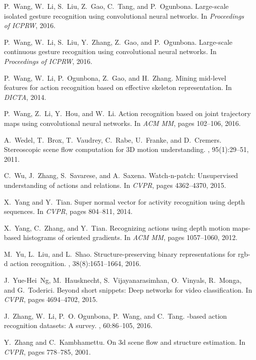 \documentclass[10pt,twocolumn,letterpaper]{article}
\begin{document}
\begin{thebibliography}{10}
P.~Wang, W.~Li, S.~Liu, Z.~Gao, C.~Tang, and P.~Ogunbona.
\newblock Large-scale isolated gesture recognition using convolutional neural
  networks.
\newblock In {\em Proceedings of ICPRW}, 2016.

P.~Wang, W.~Li, S.~Liu, Y.~Zhang, Z.~Gao, and P.~Ogunbona.
\newblock Large-scale continuous gesture recognition using convolutional neural
  networks.
\newblock In {\em Proceedings of ICPRW}, 2016.

P.~Wang, W.~Li, P.~Ogunbona, Z.~Gao, and H.~Zhang.
\newblock Mining mid-level features for action recognition based on effective
  skeleton representation.
\newblock In {\em DICTA}, 2014.

P.~Wang, Z.~Li, Y.~Hou, and W.~Li.
\newblock Action recognition based on joint trajectory maps using convolutional
  neural networks.
\newblock In {\em ACM MM}, pages 102--106, 2016.

A.~Wedel, T.~Brox, T.~Vaudrey, C.~Rabe, U.~Franke, and D.~Cremers.
\newblock Stereoscopic scene flow computation for {3D} motion understanding.
, 95(1):29--51, 2011.

C.~Wu, J.~Zhang, S.~Savarese, and A.~Saxena.
\newblock Watch-n-patch: Unsupervised understanding of actions and relations.
\newblock In {\em CVPR}, pages 4362--4370, 2015.

X.~Yang and Y.~Tian.
\newblock Super normal vector for activity recognition using depth sequences.
\newblock In {\em CVPR}, pages 804--811, 2014.

X.~Yang, C.~Zhang, and Y.~Tian.
\newblock Recognizing actions using depth motion maps-based histograms of
  oriented gradients.
\newblock In {\em ACM MM}, pages 1057--1060, 2012.

M.~Yu, L.~Liu, and L.~Shao.
\newblock Structure-preserving binary representations for rgb-d action
  recognition.
,
  38(8):1651--1664, 2016.

J.~Yue-Hei~Ng, M.~Hausknecht, S.~Vijayanarasimhan, O.~Vinyals, R.~Monga, and
  G.~Toderici.
\newblock Beyond short snippets: Deep networks for video classification.
\newblock In {\em CVPR}, pages 4694--4702, 2015.

J.~Zhang, W.~Li, P.~O. Ogunbona, P.~Wang, and C.~Tang.
-based action recognition datasets: A survey.
, 60:86--105, 2016.

Y.~Zhang and C.~Kambhamettu.
\newblock On 3d scene flow and structure estimation.
\newblock In {\em CVPR}, pages 778--785, 2001.

\end{thebibliography}
\end{document}
